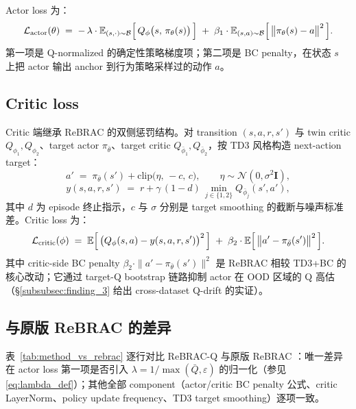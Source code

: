 Actor loss 为：
\begin{equation}
\mathcal{L}_{\mathrm{actor}}(\theta)
\;=\; -\,\lambda \cdot \mathbb{E}_{(s, \cdot) \sim \mathcal{B}}\Bigl[\,Q_\phi\bigl(s,\, \pi_\theta(s)\bigr)\,\Bigr]
\;+\; \beta_1 \cdot \mathbb{E}_{(s, a) \sim \mathcal{B}}\Bigl[\,\bigl\|\pi_\theta(s) - a\bigr\|^2\,\Bigr].
\label{eq:actor_loss}
\end{equation}
第一项是 Q-normalized 的确定性策略梯度项；第二项是 BC penalty，在状态 $s$ 上把 actor 输出 anchor 到行为策略采样过的动作 $a$。

\subsection{Critic loss}
\label{subsec:method_critic_loss}

Critic 端继承 ReBRAC 的双侧惩罚结构。对 transition $(s, a, r, s')$ 与 twin critic $Q_{\phi_1}, Q_{\phi_2}$、target actor $\pi_{\bar\theta}$、target critic $Q_{\bar\phi_1}, Q_{\bar\phi_2}$，按 TD3 风格构造 next-action target：
\begin{equation}
a' \;=\; \pi_{\bar\theta}(s') + \mathrm{clip}\bigl(\eta,\, -c,\, c\bigr),\qquad \eta \sim \mathcal{N}(0,\sigma^2 \mathbf{I}),
\label{eq:target_smoothing}
\end{equation}
\begin{equation}
y(s, a, r, s') \;=\; r + \gamma\,(1 - d)\,\min_{j \in \{1,2\}} Q_{\bar\phi_j}(s', a'),
\label{eq:bellman_target}
\end{equation}
其中 $d$ 为 episode 终止指示，$c$ 与 $\sigma$ 分别是 target smoothing 的截断与噪声标准差。Critic loss 为：
\begin{equation}
\mathcal{L}_{\mathrm{critic}}(\phi)
\;=\; \mathbb{E}\Bigl[\,\bigl(Q_\phi(s, a) - y(s, a, r, s')\bigr)^2\,\Bigr]
\;+\; \beta_2 \cdot \mathbb{E}\Bigl[\,\bigl\|a' - \pi_{\bar\theta}(s')\bigr\|^2\,\Bigr].
\label{eq:critic_loss}
\end{equation}
其中 critic-side BC penalty $\beta_2 \cdot \|a' - \pi_{\bar\theta}(s')\|^2$ 是 ReBRAC 相较 TD3+BC 的核心改动；它通过 target-Q bootstrap 链路抑制 actor 在 OOD 区域的 Q 高估（\S\ref{subsubsec:finding_3} 给出 cross-dataset Q-drift 的实证）。

\subsection{与原版 ReBRAC 的差异}
\label{subsec:method_diff}

表~\ref{tab:method_vs_rebrac} 逐行对比 ReBRAC-Q 与原版 ReBRAC \citep{tarasov2023rebrac}：唯一差异在 actor loss 第一项是否引入 $\lambda = 1/\max(\bar{Q},\varepsilon)$ 的归一化（参见 \eqref{eq:lambda_def}）；其他全部 component（actor/critic BC penalty 公式、critic LayerNorm、policy update frequency、TD3 target smoothing）逐项一致。

